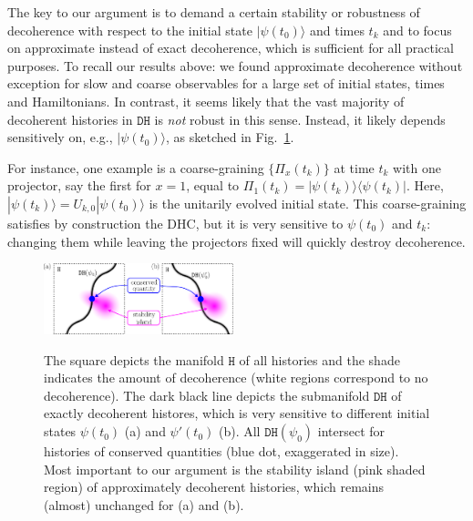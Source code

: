 \documentclass[pre,onecolumn,12pt,aps,longbibliography,nofootinbib]{revtex4-2}
\newcommand{\rl}[0]{{\rangle\langle}}
\newcommand{\blue}[1]{#1}
\begin{document}
The \blue{key to our argument} is to demand a certain stability or robustness of decoherence with respect to the initial state $|\psi(t_0)\rangle$ and times $t_k$ \blue{and to focus on approximate instead of exact decoherence, which is sufficient for all practical purposes}. To \blue{recall our results above}: we found approximate decoherence without exception for slow and coarse observables for a large set of initial states, times and Hamiltonians. In contrast, it seems likely that the vast majority of decoherent histories in $\texttt{DH}$ is \emph{not} robust in this sense. Instead, it likely depends sensitively on, e.g., $|\psi(t_0)\rangle$, as sketched in Fig.~\ref{fig set selection problem}.

For instance, one example is a coarse-graining $\{\Pi_x(t_k)\}$ at time $t_k$ with one projector, say the first for $x=1$, equal to $\Pi_{1}(t_k) = |\psi(t_k)\rl\psi(t_k)|$. Here, $|\psi(t_k)\rangle = U_{k,0}|\psi(t_0)\rangle$ is the unitarily evolved initial state. This coarse-graining satisfies by construction the DHC, but it is very sensitive to $\psi(t_0)$ and $t_k$: changing them while leaving the projectors fixed will quickly destroy decoherence.

\begin{figure}[t]
 \centering\includegraphics[width=0.49\textwidth,clip=true]{set_selection_problem.pdf}
 \label{fig set selection problem}\vspace{-0.5cm}
 \caption{The square depicts the manifold $\texttt{H}$ of all histories and the shade indicates the amount of decoherence (white regions correspond to no decoherence). The dark black line depicts the submanifold $\texttt{DH}$ of exactly decoherent histores, which is very sensitive to different initial states $\psi(t_0)$ (a) and $\psi'(t_0)$ (b). All $\texttt{DH}(\psi_0)$ intersect for histories of conserved quantities (blue dot, exaggerated in size). Most important to our argument is the stability island (pink shaded region) of approximately decoherent histories, which remains (almost) unchanged for (a) and (b). }
\end{figure}
\end{document}
